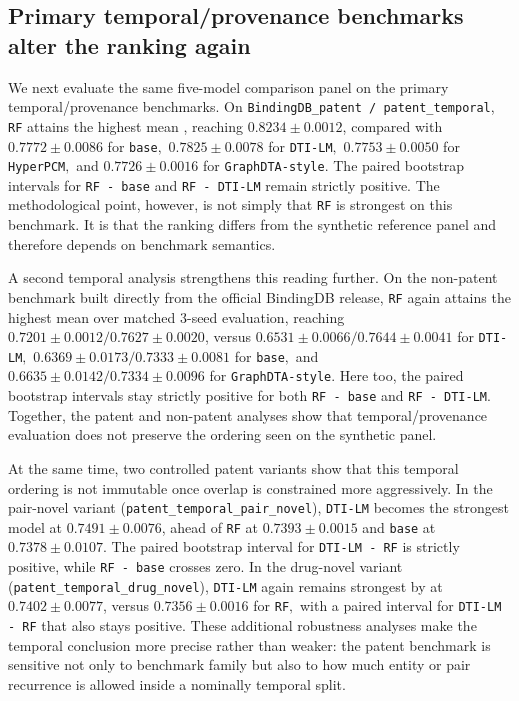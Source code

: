 \subsection{Primary temporal/provenance benchmarks alter the ranking again}

We next evaluate the same five-model comparison panel on the primary temporal/provenance benchmarks. On \texttt{BindingDB\_patent / patent\_temporal}, \texttt{RF} attains the highest mean \AUPRC{}, reaching $0.8234 \pm 0.0012$, compared with $0.7772 \pm 0.0086$ for \texttt{base}$,$ $0.7825 \pm 0.0078$ for \texttt{DTI-LM}$,$ $0.7753 \pm 0.0050$ for \texttt{HyperPCM}$,$ and $0.7726 \pm 0.0016$ for \texttt{GraphDTA-style}. The paired bootstrap intervals for \texttt{RF - base} and \texttt{RF - DTI-LM} remain strictly positive. The methodological point, however, is not simply that \texttt{RF} is strongest on this benchmark. It is that the ranking differs from the synthetic reference panel and therefore depends on benchmark semantics.

A second temporal analysis strengthens this reading further. On the non-patent benchmark built directly from the official BindingDB release, \texttt{RF} again attains the highest mean \AUPRC{} over matched 3-seed evaluation, reaching $0.7201 \pm 0.0012 / 0.7627 \pm 0.0020$, versus $0.6531 \pm 0.0066 / 0.7644 \pm 0.0041$ for \texttt{DTI-LM}$,$ $0.6369 \pm 0.0173 / 0.7333 \pm 0.0081$ for \texttt{base}$,$ and $0.6635 \pm 0.0142 / 0.7334 \pm 0.0096$ for \texttt{GraphDTA-style}. Here too, the paired bootstrap intervals stay strictly positive for both \texttt{RF - base} and \texttt{RF - DTI-LM}. Together, the patent and non-patent analyses show that temporal/provenance evaluation does not preserve the ordering seen on the synthetic panel.

At the same time, two controlled patent variants show that this temporal ordering is not immutable once overlap is constrained more aggressively. In the pair-novel variant (\texttt{patent\_temporal\_pair\_novel}), \texttt{DTI-LM} becomes the strongest \AUPRC{} model at $0.7491 \pm 0.0076$, ahead of \texttt{RF} at $0.7393 \pm 0.0015$ and \texttt{base} at $0.7378 \pm 0.0107$. The paired bootstrap interval for \texttt{DTI-LM - RF} is strictly positive, while \texttt{RF - base} crosses zero. In the drug-novel variant (\texttt{patent\_temporal\_drug\_novel}), \texttt{DTI-LM} again remains strongest by \AUPRC{} at $0.7402 \pm 0.0077$, versus $0.7356 \pm 0.0016$ for \texttt{RF}$,$ with a paired interval for \texttt{DTI-LM - RF} that also stays positive. These additional robustness analyses make the temporal conclusion more precise rather than weaker: the patent benchmark is sensitive not only to benchmark family but also to how much entity or pair recurrence is allowed inside a nominally temporal split.

